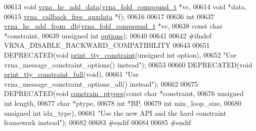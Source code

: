 \begin{DoxyCode}
00613 \textcolor{keywordtype}{void} \hyperlink{hard_8h_a128920e0af52e4196a9d59fa13336c7c}{vrna\_hc\_add\_data}(\hyperlink{group__fold__compound_structvrna__fc__s}{vrna\_fold\_compound\_t}        *vc,
00614                       \textcolor{keywordtype}{void}                        *data,
00615                       \hyperlink{group__fold__compound_ga7806651f51b195013839a218b3bbd5a3}{vrna\_callback\_free\_auxdata}  *f);
00616 
00617 
00636 \textcolor{keywordtype}{int}
00637 \hyperlink{group__hard__constraints_ga5b4de3247b67358080c176b94591a8e6}{vrna\_hc\_add\_from\_db}(\hyperlink{group__fold__compound_structvrna__fc__s}{vrna\_fold\_compound\_t}  *vc,
00638                     \textcolor{keyword}{const} \textcolor{keywordtype}{char}            *constraint,
00639                     \textcolor{keywordtype}{unsigned} \textcolor{keywordtype}{int}          \hyperlink{group__hard__constraints_a468414760f373f7dc0eb1fd47cf708d0}{options});
00640 
00641 
00642 \textcolor{preprocessor}{#ifndef VRNA\_DISABLE\_BACKWARD\_COMPATIBILITY}
00643 
00651 DEPRECATED(\textcolor{keywordtype}{void} \hyperlink{hard_8h_a4d167deb70bb51723e44374dc981deb2}{print\_tty\_constraint}(\textcolor{keywordtype}{unsigned} \textcolor{keywordtype}{int} option),
00652           \textcolor{stringliteral}{"Use vrna\_message\_constraint\_options() instead"});
00653 
00660 DEPRECATED(\textcolor{keywordtype}{void} \hyperlink{hard_8h_ae8ae8a34962b9959be3f6c40f0a80ac1}{print\_tty\_constraint\_full}(\textcolor{keywordtype}{void}),
00661           \textcolor{stringliteral}{"Use vrna\_message\_constraint\_options\_all() instead"});
00662 
00675 DEPRECATED(\textcolor{keywordtype}{void} \hyperlink{hard_8h_a36c3a6c3218b041f992052767bc74549}{constrain\_ptypes}(\textcolor{keyword}{const} \textcolor{keywordtype}{char}   *constraint,
00676                                  \textcolor{keywordtype}{unsigned} \textcolor{keywordtype}{int} length,
00677                                  \textcolor{keywordtype}{char}         *ptype,
00678                                  \textcolor{keywordtype}{int}          *BP,
00679                                  \textcolor{keywordtype}{int}          min\_loop\_size,
00680                                  \textcolor{keywordtype}{unsigned} \textcolor{keywordtype}{int} idx\_type),
00681           \textcolor{stringliteral}{"Use the new API and the hard constraint framework instead"});
00682 
00683 \textcolor{preprocessor}{#endif}
00684 
00685 \textcolor{preprocessor}{#endif}
\end{DoxyCode}
